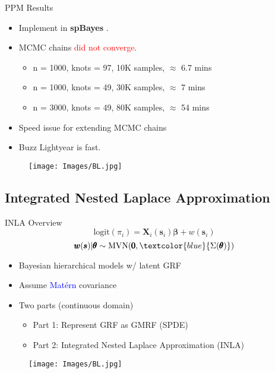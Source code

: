 \documentclass{beamer}
\begin{document}
\begin{frame}{PPM Results}

\begin{itemize}
\addtolength{\itemsep}{0.5\baselineskip}
\item Implement in {\bf spBayes} \citep{Finley2013}.
\item MCMC chains \textcolor{red}{did not converge}. \\
      \begin{itemize}
      \addtolength{\itemsep}{0.5\baselineskip}
      \item n = 1000, knots = 97, 10K samples, $\approx$ 6.7 mins
      \item n = 1000, knots = 49, 30K samples, $\approx$ 7 mins
      \item n = 3000, knots = 49, 80K samples, $\approx$ 54 mins
      \end{itemize}
\item Speed issue for extending MCMC chains
\item Buzz Lightyear is fast.
\end{itemize}
  \begin{figure}[H]
	\centering
	\texttt{[image: Images/BL.jpg]}
	\end{figure}
\end{frame}

\subsection{Integrated Nested Laplace Approximation}

\begin{frame}{INLA Overview}
$$ \text{logit}(\pi_{i}) = \pmb{X}_{i}(\pmb{s}_{i})\pmb{\beta} + w(\pmb{s}_{i}) $$
$$\pmb{w}(\pmb{s}) | \pmb{\theta} \sim \text{MVN}(\pmb{0}, \textcolor{blue}{\Sigma(\pmb{\theta})})$$
\begin{itemize}
\addtolength{\itemsep}{0.5\baselineskip}
\item Bayesian hierarchical models w/ latent GRF
\item Assume \textcolor{blue}{Mat\'ern} covariance
\item Two parts (continuous domain) \\
  \begin{itemize}
  \addtolength{\itemsep}{0.5\baselineskip}
  \item Part 1: Represent GRF as GMRF (SPDE)
  \item Part 2: Integrated Nested Laplace Approximation (INLA)
  \end{itemize}
\end{itemize}
  \begin{figure}[H]
	\centering
	\texttt{[image: Images/BL.jpg]}
	\end{figure}
	
\end{frame}
\end{document}
